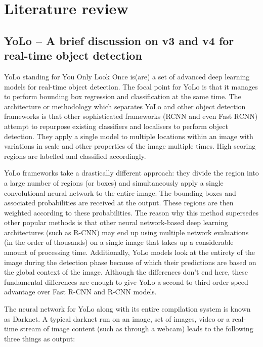 \chapter{Literature review} \label{chapter2}

\section{YoLo – A brief discussion on v3 and v4 for real-time object detection}
YoLo standing for You Only Look Once is(are) a set of advanced deep learning models for real-time object detection. The focal point for YoLo is that it manages to perform bounding box regression and classification at the same time. The architecture or methodology which separates YoLo and other object detection frameworks is that other sophisticated frameworks (RCNN and even Fast RCNN) attempt to repurpose existing classifiers and localisers to perform object detection. They apply a single model to multiple locations within an image with variations in scale and other properties of the image multiple times. High scoring regions are labelled and classified accordingly. \par

YoLo frameworks take a drastically different approach: they divide the region into a large number of regions (or boxes) and simultaneously apply a single convolutional neural network to the entire image. The bounding boxes and associated probabilities are received at the output. These regions are then weighted according to these probabilities. The reason why this method supersedes other popular methods is that other neural network-based deep learning architectures (such as R-CNN) may end up using multiple network evaluations (in the order of thousands) on a single image that takes up a considerable amount of processing time. Additionally, YoLo models look at the entirety of the image during the detection phase because of which their predictions are based on the global context of the image. Although the differences don’t end here, these fundamental differences are enough to give YoLo a second to third order speed advantage over Fast R-CNN and R-CNN models. \par

The neural network for YoLo along with its entire compilation system is known as Darknet. A typical darknet run on an image, set of images, video or a real-time stream of image content (such as through a webcam) leads to the following three things as output:

